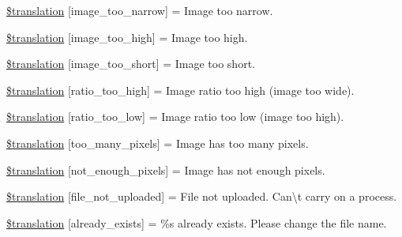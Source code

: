 \begin{DoxyCompactItemize}
\item 
\hyperlink{class_8upload_8xx___x_x_8php_a5c9a4cd67fd21c32e0a3b434591a6037}{\$translation} \mbox{[}\textquotesingle{}image\+\_\+too\+\_\+narrow\textquotesingle{}\mbox{]} = \textquotesingle{}Image too narrow.\textquotesingle{}
\item 
\hyperlink{class_8upload_8xx___x_x_8php_aa27bde361343f3b63c7cd441860024f8}{\$translation} \mbox{[}\textquotesingle{}image\+\_\+too\+\_\+high\textquotesingle{}\mbox{]} = \textquotesingle{}Image too high.\textquotesingle{}
\item 
\hyperlink{class_8upload_8xx___x_x_8php_a86fcd4e1157b00032df451188d735527}{\$translation} \mbox{[}\textquotesingle{}image\+\_\+too\+\_\+short\textquotesingle{}\mbox{]} = \textquotesingle{}Image too short.\textquotesingle{}
\item 
\hyperlink{class_8upload_8xx___x_x_8php_a23396f6ce7f31e5e5f1b57580621d982}{\$translation} \mbox{[}\textquotesingle{}ratio\+\_\+too\+\_\+high\textquotesingle{}\mbox{]} = \textquotesingle{}Image ratio too high (image too wide).\textquotesingle{}
\item 
\hyperlink{class_8upload_8xx___x_x_8php_ac533b9a479f056b0b8623e4268f068c2}{\$translation} \mbox{[}\textquotesingle{}ratio\+\_\+too\+\_\+low\textquotesingle{}\mbox{]} = \textquotesingle{}Image ratio too low (image too high).\textquotesingle{}
\item 
\hyperlink{class_8upload_8xx___x_x_8php_aa4051ef64e94a3f8295c63cf85544016}{\$translation} \mbox{[}\textquotesingle{}too\+\_\+many\+\_\+pixels\textquotesingle{}\mbox{]} = \textquotesingle{}Image has too many pixels.\textquotesingle{}
\item 
\hyperlink{class_8upload_8xx___x_x_8php_a1fe342c27ce61f4ff4e0120ba647033e}{\$translation} \mbox{[}\textquotesingle{}not\+\_\+enough\+\_\+pixels\textquotesingle{}\mbox{]} = \textquotesingle{}Image has not enough pixels.\textquotesingle{}
\item 
\hyperlink{class_8upload_8xx___x_x_8php_a4ce76e7be0b3a03c2b47f6d70c21832e}{\$translation} \mbox{[}\textquotesingle{}file\+\_\+not\+\_\+uploaded\textquotesingle{}\mbox{]} = \textquotesingle{}File not uploaded. Can\textbackslash{}\textquotesingle{}t carry on a process.\textquotesingle{}
\item 
\hyperlink{class_8upload_8xx___x_x_8php_afd84e910217f04139f567c41e292afa5}{\$translation} \mbox{[}\textquotesingle{}already\+\_\+exists\textquotesingle{}\mbox{]} = \textquotesingle{}\%s already exists. Please change the file name.\textquotesingle{}
\item 

\end{DoxyCompactItemize}
